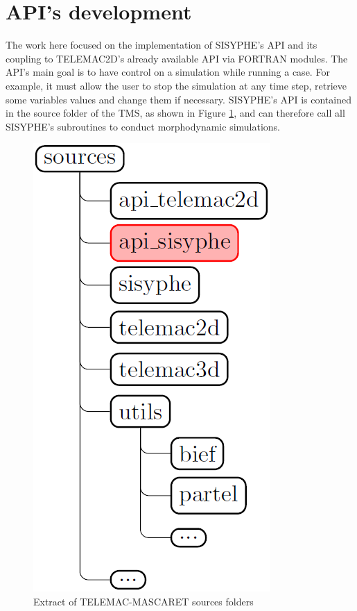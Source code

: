 \section{API's development}
\label{section:API}
The work here focused on the implementation of SISYPHE's API and its coupling to TELEMAC2D's already available API via FORTRAN modules. The API's main goal is to have control on a simulation while running a case. For example, it must allow the user to stop the simulation at any time step, retrieve some variables values and change them if necessary. SISYPHE's API is contained in the source folder of the TMS, as shown in Figure \ref{fig:API_sources}, and can therefore call all SISYPHE's subroutines to conduct morphodynamic simulations.
\begin{figure}[h!]
    \centering
    \includegraphics[trim={0 0 0 0},clip,scale=0.3]{Images/API_sources}
    \caption{Extract of TELEMAC-MASCARET sources folders}
    \label{fig:API_sources}
    \vspace{-0.5cm}
\end{figure}

